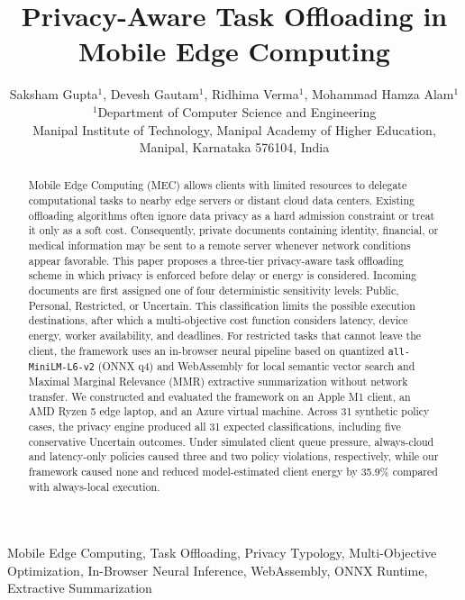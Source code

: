 \documentclass[conference]{IEEEtran}
\begin{document}
\title{Privacy-Aware Task Offloading in Mobile Edge Computing}

\author{
  Saksham Gupta$^{1}$, Devesh Gautam$^{1}$, Ridhima Verma$^{1}$, Mohammad Hamza Alam$^{1}$\\[3pt]
  $^{1}$Department of Computer Science and Engineering\\
  Manipal Institute of Technology, Manipal Academy of Higher Education, Manipal, Karnataka 576104, India
}

\maketitle

\begin{abstract}
Mobile Edge Computing (MEC) allows clients with limited resources to delegate computational tasks to nearby edge servers or distant cloud data centers.
Existing offloading algorithms often ignore data privacy as a hard admission constraint or treat it only as a soft cost.
Consequently, private documents containing identity, financial, or medical information may be sent to a remote server whenever network conditions appear favorable.
This paper proposes a three-tier privacy-aware task offloading scheme in which privacy is enforced before delay or energy is considered.
Incoming documents are first assigned one of four deterministic sensitivity levels: Public, Personal, Restricted, or Uncertain.
This classification limits the possible execution destinations, after which a multi-objective cost function considers latency, device energy, worker availability, and deadlines.
For restricted tasks that cannot leave the client, the framework uses an in-browser neural pipeline based on quantized \texttt{all-MiniLM-L6-v2} (ONNX q4) and WebAssembly for local semantic vector search and Maximal Marginal Relevance (MMR) extractive summarization without network transfer.
We constructed and evaluated the framework on an Apple M1 client, an AMD Ryzen 5 edge laptop, and an Azure virtual machine.
Across 31 synthetic policy cases, the privacy engine produced all 31 expected classifications, including five conservative Uncertain outcomes.
Under simulated client queue pressure, always-cloud and latency-only policies caused three and two policy violations, respectively, while our framework caused none and reduced model-estimated client energy by 35.9\% compared with always-local execution.
\end{abstract}

\begin{IEEEkeywords}
Mobile Edge Computing, Task Offloading, Privacy Typology, Multi-Objective Optimization, In-Browser Neural Inference, WebAssembly, ONNX Runtime, Extractive Summarization
\end{IEEEkeywords}
\end{document}
